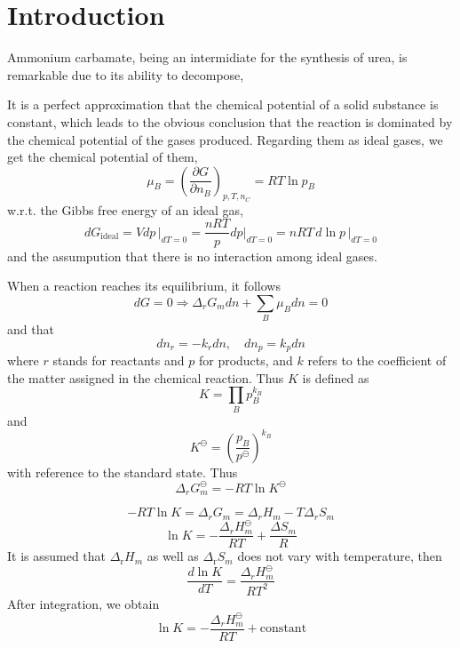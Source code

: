 \documentclass[%
 reprint,
 amsmath,amssymb,
 aps,
10.5pt,
]{revtex4-1}
\begin{document}
\section{Introduction}
Ammonium carbamate, being an intermidiate for the synthesis of urea, is remarkable due to its ability to decompose,
\begin{center}
\end{center}
It is a perfect approximation that the chemical potential of a solid substance is constant, which leads to the obvious conclusion that the reaction is dominated by the chemical potential of the gases produced. Regarding them as ideal gases, we get the chemical potential of them,
\begin{equation}
\mu_B =\left(\frac{\partial G}{\partial n_B} \right)_{p,T,n_C} = RT\ln{p_B}
\end{equation}
w.r.t. the Gibbs free energy of an ideal gas,
\begin{equation}
d G_\text{ideal} = Vdp\,\Big|_{dT=0} = \frac{nRT}{p} dp \Big|_{dT=0} = nRT \, d\ln{p}\,\Big|_{dT=0}
\end{equation}
and the assumpution that there is no interaction among ideal gases.

When a reaction reaches its equilibrium, it follows
\begin{equation}
dG =0 \Rightarrow \Delta_r G_m d n + \sum_B \mu_B d n = 0
\end{equation}
and that
\begin{equation}
d n_r = - k_r d n , \quad d n_p = k_p d n
\end{equation}
where $r$ stands for reactants and $p$ for products, and $k$ refers to the coefficient of the matter assigned in the chemical reaction.
Thus $K$ is defined as
\begin{equation}
K = \prod_B  p_B^{k_B}
\end{equation}
and
\begin{equation}
K^\ominus = \left(\frac{p_B}{p^\ominus}\right)^{k_B}
\end{equation}
with reference to the standard state. Thus
\begin{equation}
\Delta_r G_m^\ominus = -RT \ln{K^\ominus}
\end{equation}

\begin{equation}
-RT \ln{K} = \Delta_r G_m = \Delta_r H_m - T \Delta_r S_m
\end{equation}
\begin{equation}
\ln{K} =- \frac{\Delta_r H_m^\ominus}{RT} + \frac{\Delta S_m}{R}
\end{equation}
It is assumed that $\Delta_\text{r} H_m$ as well as $\Delta_\text{r} S_m$ does not vary with temperature, then
\begin{equation}
\frac{d \ln{K}}{dT} = \frac{\Delta_r H_m ^\ominus}{RT^2}
\end{equation}
After integration, we obtain
\begin{equation}
\ln{K} = -\frac{\Delta_r H_m^\ominus}{RT} + \mathrm{constant}
\end{equation}
\end{document}
